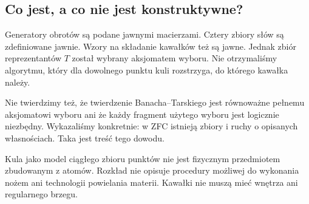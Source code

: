 \subsection{Co jest, a co nie jest konstruktywne?}
Generatory obrotów są podane jawnymi macierzami. Cztery zbiory słów są zdefiniowane jawnie. Wzory na składanie kawałków też są jawne. Jednak zbiór reprezentantów $T$ został wybrany aksjomatem wyboru. Nie otrzymaliśmy algorytmu, który dla dowolnego punktu kuli rozstrzyga, do którego kawałka należy.

Nie twierdzimy też, że twierdzenie Banacha--Tarskiego jest równoważne pełnemu aksjomatowi wyboru ani że każdy fragment użytego wyboru jest logicznie niezbędny. Wykazaliśmy konkretnie: w ZFC istnieją zbiory i ruchy o opisanych własnościach. Taka jest treść tego dowodu.

Kula jako model ciągłego zbioru punktów nie jest fizycznym przedmiotem zbudowanym z atomów. Rozkład nie opisuje procedury możliwej do wykonania nożem ani technologii powielania materii. Kawałki nie muszą mieć wnętrza ani regularnego brzegu.

